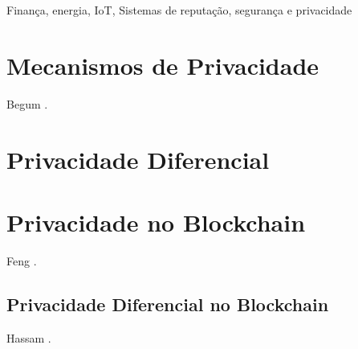 
Finança, energia, IoT, Sistemas de reputação, segurança e privacidade 

\chapter{Mecanismos de Privacidade}
Begum \cite{article:BegumSNausheenF2018}.

\chapter{Privacidade Diferencial}
\label{cap:privacidadediferencial}

\chapter{Privacidade no Blockchain}
\label{cap:blockchain}
Feng \cite{Feng2019}.

\section{Privacidade Diferencial no Blockchain}
Hassam \cite{Hassan2020}. %

